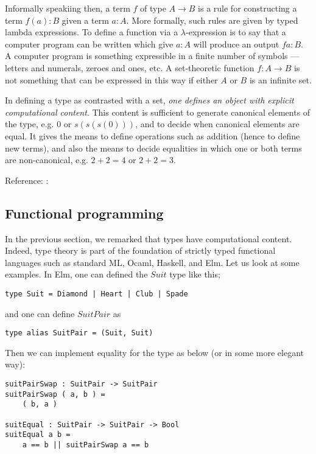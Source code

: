 Informally speakiing then, a term $f$ of type $A \to B$ is a rule for constructing a term $f(a): B$ given a term $a:A$.  More formally, such rules are given by typed lambda expressions.  To define a function via a $\lambda$-expression is to say that a computer program can be written which give $a: A$ will produce an output $f a : B$.  A computer program is something expressible in a finite number of symbols — letters and numerals, zeroes and ones, etc.  A set-theoretic function $f : A \to B$ is not something that can be expressed in this way if either $A$ or $B$ is an infinite set.




 In defining a type as contrasted with a set, \emph{one defines an object  with explicit computational content}.  This content is sufficient to generate canonical elements of the type, e.g. $0$ or $s(s(s(0)))$, and to decide when canonical elements are equal.  It gives the means to define operations such as addition (hence to define new terms), and also the means to decide equalities in which one or both terms are non-canonical, e.g. $2 + 2 = 4$ or $2 + 2 = 3$.

Reference: \cite{EPB}:


\subsection{Functional programming}

In the previous section, we remarked that types have computational content.  Indeed, type theory is part of the foundation of strictly typed functional languages such as standard ML, Ocaml, Haskell, and Elm.  Let us look at some examples.  In Elm, one can defined the $Suit$ type like this;

\begin{verbatim}
type Suit = Diamond | Heart | Club | Spade
\end{verbatim}

and one can define $SuitPair$ as

\begin{verbatim}
type alias SuitPair = (Suit, Suit)
\end{verbatim}

Then we can implement equality for the  type as below (or in some more elegant way):

\begin{verbatim}
suitPairSwap : SuitPair -> SuitPair
suitPairSwap ( a, b ) =
    ( b, a )

suitEqual : SuitPair -> SuitPair -> Bool
suitEqual a b =
    a == b || suitPairSwap a == b

\end{verbatim}

